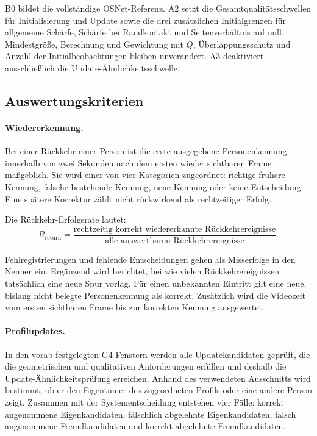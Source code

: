 \documentclass[runningheads,a4paper]{llncs}
\begin{document}
B0 bildet die vollständige OSNet-Referenz. A2 setzt die Gesamtqualitätsschwellen für Initialisierung und Update sowie die drei zusätzlichen Initialgrenzen für allgemeine Schärfe, Schärfe bei Randkontakt und Seitenverhältnis auf null. Mindestgrö{\ss}e, Berechnung und Gewichtung mit $Q$, Überlappungsschutz und Anzahl der Initialbeobachtungen bleiben unverändert. A3 deaktiviert ausschlie{\ss}lich die Update-Ähnlichkeitsschwelle.

\subsection{Auswertungskriterien}
\label{sec:metrics}

\paragraph{Wiedererkennung.}
Bei einer Rückkehr einer Person ist die erste ausgegebene Personenkennung innerhalb von zwei Sekunden nach dem ersten wieder sichtbaren Frame ma{\ss}geblich. Sie wird einer von vier Kategorien zugeordnet: richtige frühere Kennung, falsche bestehende Kennung, neue Kennung oder keine Entscheidung. Eine spätere Korrektur zählt nicht rückwirkend als rechtzeitiger Erfolg.

Die Rückkehr-Erfolgsrate lautet:
\begin{equation}
R_{\mathrm{return}}=
\frac{\text{rechtzeitig korrekt wiedererkannte Rückkehrereignisse}}
{\text{alle auswertbaren Rückkehrereignisse}}.
\label{eq:reentry}
\end{equation}

Fehlregistrierungen und fehlende Entscheidungen gehen als Misserfolge in den Nenner ein. Ergänzend wird berichtet, bei wie vielen Rückkehrereignissen tatsächlich eine neue Spur vorlag. Für einen unbekannten Eintritt gilt eine neue, bislang nicht belegte Personenkennung als korrekt. Zusätzlich wird die Videozeit vom ersten sichtbaren Frame bis zur korrekten Kennung ausgewertet.

\paragraph{Profilupdates.}
In den vorab festgelegten G4-Fenstern werden alle Updatekandidaten geprüft, die die geometrischen und qualitativen Anforderungen erfüllen und deshalb die Update-Ähnlichkeitsprüfung erreichen. Anhand des verwendeten Ausschnitts wird bestimmt, ob er den Eigentümer des zugeordneten Profils oder eine andere Person zeigt. Zusammen mit der Systementscheidung entstehen vier Fälle: korrekt angenommene Eigenkandidaten, fälschlich abgelehnte Eigenkandidaten, falsch angenommene Fremdkandidaten und korrekt abgelehnte Fremdkandidaten.
\end{document}
